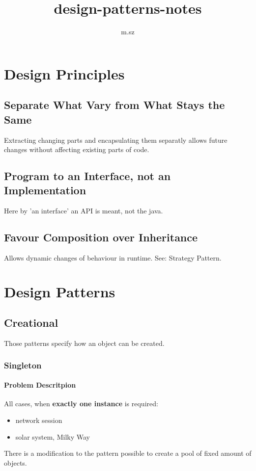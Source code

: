 \documentclass{report}
\title{design-patterns-notes}
\author{m.sz}
\begin{document}
\maketitle
{}
\tableofcontents





\part{Design Principles}


\chapter{Separate What Vary from What Stays the Same}
Extracting changing parts and encapsulating them separatly allows future changes without affecting existing parts of code.


\chapter{Program to an Interface, not an Implementation}
Here by 'an interface' an API is meant, not the java.

\chapter{Favour Composition over Inheritance}
Allows dynamic changes of behaviour in runtime. See: Strategy Pattern.




\part{Design Patterns}


\chapter{Creational}
Those patterns specify how an object can be created.


\section{Singleton}

\subsection{Problem Descritpion}
All cases, when \textbf{exactly one instance} is required:
\begin{itemize}
	\item network session
	\item solar system, Milky Way
\end{itemize}
There is a modification to the pattern possible to create a pool of fixed amount of objects.
\end{document}
